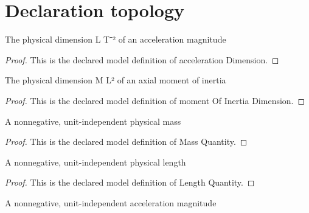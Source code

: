 \section{Declaration topology}
\begin{definition}
  \label{def:physics:phyx-mini-0779:phyxminiproblems-problemphyxmini0779-accelerationdimension}
  The physical dimension L T⁻² of an acceleration magnitude
\end{definition}
\begin{proof}
  This is the declared model definition of acceleration Dimension.
\end{proof}
\begin{definition}
  \label{def:physics:phyx-mini-0779:phyxminiproblems-problemphyxmini0779-momentofinertiadimension}
  The physical dimension M L² of an axial moment of inertia
\end{definition}
\begin{proof}
  This is the declared model definition of moment Of Inertia Dimension.
\end{proof}
\begin{definition}
  \label{def:physics:phyx-mini-0779:phyxminiproblems-problemphyxmini0779-massquantity}
  A nonnegative, unit-independent physical mass
\end{definition}
\begin{proof}
  This is the declared model definition of Mass Quantity.
\end{proof}
\begin{definition}
  \label{def:physics:phyx-mini-0779:phyxminiproblems-problemphyxmini0779-lengthquantity}
  A nonnegative, unit-independent physical length
\end{definition}
\begin{proof}
  This is the declared model definition of Length Quantity.
\end{proof}
\begin{definition}
  \label{def:physics:phyx-mini-0779:phyxminiproblems-problemphyxmini0779-accelerationquantity}
  A nonnegative, unit-independent acceleration magnitude
\end{definition}
